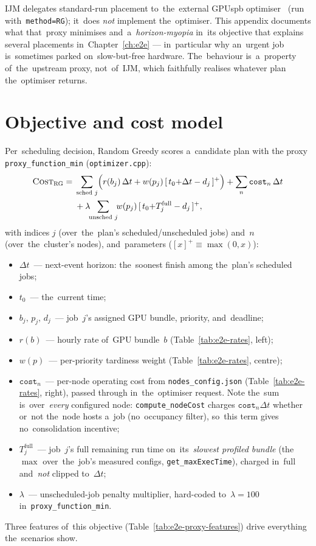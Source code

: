 IJM delegates standard-run placement to~the~external GPUspb
optimiser~\cite{filippini2023pathrelinking,filippini2024stochastic}
(run with~\texttt{method=RG}); it~does \emph{not} implement the~optimiser.
This appendix documents what that~proxy minimises and~a~\emph{horizon-myopia}
in~its objective that explains several placements in~Chapter~\ref{ch:e2e}
--- in~particular why an~urgent job is~sometimes parked on~slow-but-free
hardware.  The~behaviour is~a~property of~the~upstream proxy, not~of~IJM,
which faithfully realises whatever plan the~optimiser returns.

\section{Objective and cost model}
\label{sec:e2e-objective}

Per~scheduling decision, Random Greedy scores a~candidate plan with the
proxy \texttt{proxy\_function\_min} (\texttt{optimizer.cpp}):
\[
\begin{aligned}
\textsc{Cost}_\textsc{RG}={}&
  \sum_{\text{sched }j}\!\Big(r(b_j)\,\Delta t + w(p_j)\,[\,t_0{+}\Delta t-d_j\,]^{+}\Big)
  + \sum_{n}\texttt{cost}_n\,\Delta t \\
  &{}+ \lambda\!\!\sum_{\text{unsched }j}\!\! w(p_j)\,[\,t_0{+}T^{\mathrm{full}}_j-d_j\,]^{+},
\end{aligned}
\]
with indices $j$ (over~the~plan's scheduled/unscheduled jobs) and~$n$
(over~the~cluster's nodes), and~parameters ($[x]^{+}\equiv\max(0,x)$):
\begin{itemize}[leftmargin=*,itemsep=1pt,topsep=2pt]
  \item $\Delta t$~--- next-event horizon: the~soonest finish among the~plan's scheduled jobs;
  \item $t_0$~--- the~current time;
  \item $b_j,\,p_j,\,d_j$~--- job~$j$'s assigned GPU bundle, priority, and~deadline;
  \item $r(b)$~--- hourly rate of~GPU bundle~$b$ (Table~\ref{tab:e2e-rates}, left);
  \item $w(p)$~--- per-priority tardiness weight (Table~\ref{tab:e2e-rates}, centre);
  \item $\texttt{cost}_n$~--- per-node operating cost from \texttt{nodes\_config.json} (Table~\ref{tab:e2e-rates}, right), passed through in~the~optimiser request.  Note the~sum is~over~\emph{every} configured node: \texttt{compute\_nodeCost} charges $\texttt{cost}_n\Delta t$ whether or~not the~node hosts a~job (no~occupancy filter), so~this term gives no~consolidation incentive;
  \item $T^{\mathrm{full}}_j$~--- job~$j$'s full remaining run time on~its~\emph{slowest profiled bundle} (the~$\max$ over~the~job's measured configs, \texttt{get\_maxExecTime}), charged in~full and~\emph{not} clipped to~$\Delta t$;
  \item $\lambda$~--- unscheduled-job penalty multiplier, hard-coded to~$\lambda{=}100$ in~\texttt{proxy\_function\_min}.
\end{itemize}
Three features of~this objective (Table~\ref{tab:e2e-proxy-features}) drive
everything the~scenarios show.

